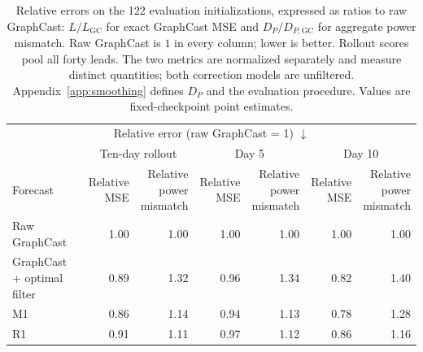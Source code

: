 \documentclass{article}
\newcommand{\vfourchange}[1]{{\color{blue}#1}}
\newcommand{\vfourred}[1]{{\color{red}#1}}
\newif\ifvfivechanges
\newcommand{\vfiveidentity}[1]{#1}
\DeclareRobustCommand{\vfiveadded}[1]{\ifvfivechanges{\color{vfiveAdded}%
  \let\vfourchange\vfiveidentity\let\vfourred\vfiveidentity#1}\else{\color{blue}%
  \let\vfourchange\vfiveidentity\let\vfourred\vfiveidentity#1}\fi}
\DeclareRobustCommand{\vfiveRone}[1]{\ifvfivechanges{\color{vfiveDeleted}\sout{#1}}\,\fi\vfiveadded{R1}}
\begin{document}
\begin{table}[!htbp]
    \centering
    \begingroup\color{red}\small
    \setlength{\tabcolsep}{4pt}
    \begin{tabular}{lrrrrrr}
        \toprule
        \multicolumn{7}{c}{Relative error (raw GraphCast = 1) $\downarrow$} \\
        \addlinespace[2pt]
        & \multicolumn{2}{c}{Ten-day rollout} & \multicolumn{2}{c}{Day 5} & \multicolumn{2}{c}{Day 10} \\
        \cmidrule(lr){2-3}\cmidrule(lr){4-5}\cmidrule(lr){6-7}
        Forecast & \shortstack{Relative\\MSE} & \shortstack{Relative\\power\\mismatch} & \shortstack{Relative\\MSE} & \shortstack{Relative\\power\\mismatch} & \shortstack{Relative\\MSE} & \shortstack{Relative\\power\\mismatch} \\
        \midrule
        Raw GraphCast & 1.00 & 1.00 & 1.00 & 1.00 & 1.00 & 1.00 \\
        GraphCast + optimal filter & 0.89 & 1.32 & 0.96 & 1.34 & 0.82 & 1.40 \\
        M1 & 0.86 & 1.14 & 0.94 & 1.13 & 0.78 & 1.28 \\
        \vfiveRone{Reset/reset} & 0.91 & 1.11 & 0.97 & 1.12 & 0.86 & 1.16 \\
        \bottomrule
    \end{tabular}
    \endgroup
    \caption{\vfourred{Relative errors on the 122 evaluation initializations, expressed as ratios to raw GraphCast: $L/L_{\mathrm{GC}}$ for exact GraphCast MSE and $D_P/D_{P,\mathrm{GC}}$ for aggregate power mismatch. Raw GraphCast is $1$ in every column; lower is better. Rollout scores pool all forty leads. The two metrics are normalized separately and measure distinct quantities; both correction models are unfiltered. Appendix~\ref{app:smoothing} defines $D_P$ and the evaluation procedure. Values are fixed-checkpoint point estimates.}}
    \label{tab:smoothing_scores}
\end{table}
\end{document}
